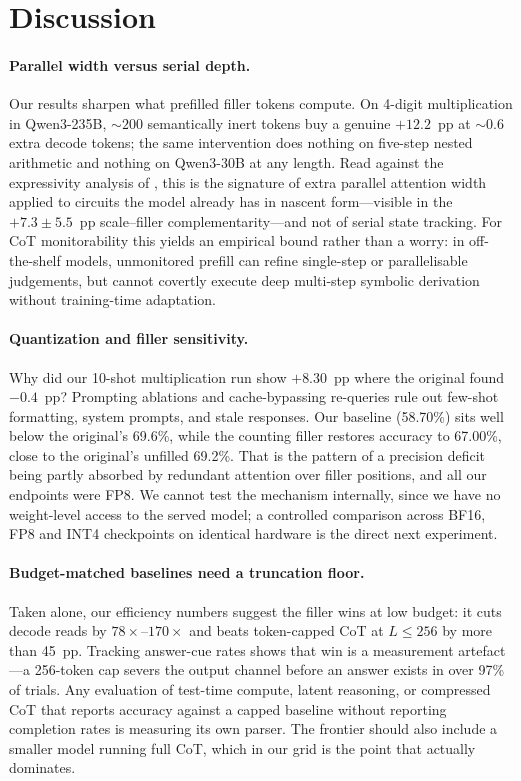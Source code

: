 \documentclass[11pt,a4paper]{article}
\begin{document}
\section{Discussion}
\label{sec:discussion}

\paragraph{Parallel width versus serial depth.}
Our results sharpen what prefilled filler tokens compute. On 4-digit
multiplication in Qwen3-235B, ${\sim}200$ semantically inert tokens buy a genuine
$+12.2$~pp at ${\sim}0.6$ extra decode tokens; the same intervention does nothing
on five-step nested arithmetic and nothing on Qwen3-30B at any length. Read
against the expressivity analysis of \citet{pfau2024dot}, this is the signature of
extra parallel attention width applied to circuits the model already has in
nascent form---visible in the $+7.3\pm5.5$~pp scale--filler complementarity---and
not of serial state tracking. For CoT monitorability this yields an empirical
bound rather than a worry: in off-the-shelf models, unmonitored prefill can refine
single-step or parallelisable judgements, but cannot covertly execute deep
multi-step symbolic derivation without training-time adaptation.

\paragraph{Quantization and filler sensitivity.}
Why did our 10-shot multiplication run show $+8.30$~pp where the original found
$-0.4$~pp? Prompting ablations and cache-bypassing re-queries rule out few-shot
formatting, system prompts, and stale responses. Our baseline (58.70\%) sits well
below the original's 69.6\%, while the counting filler restores accuracy to
67.00\%, close to the original's unfilled 69.2\%. That is the pattern of a
precision deficit being partly absorbed by redundant attention over filler
positions, and all our endpoints were FP8. We cannot test the mechanism
internally, since we have no weight-level access to the served model; a controlled
comparison across BF16, FP8 and INT4 checkpoints on identical hardware is the
direct next experiment.

\paragraph{Budget-matched baselines need a truncation floor.}
Taken alone, our efficiency numbers suggest the filler wins at low budget: it cuts
decode reads by $78\times$--$170\times$ and beats token-capped CoT at
$L\leq256$ by more than 45~pp. Tracking answer-cue rates shows that win is a
measurement artefact---a 256-token cap severs the output channel before an answer
exists in over 97\% of trials. Any evaluation of test-time compute, latent
reasoning, or compressed CoT that reports accuracy against a capped baseline
without reporting completion rates is measuring its own parser. The frontier
should also include a smaller model running full CoT, which in our grid is the
point that actually dominates.
\end{document}
